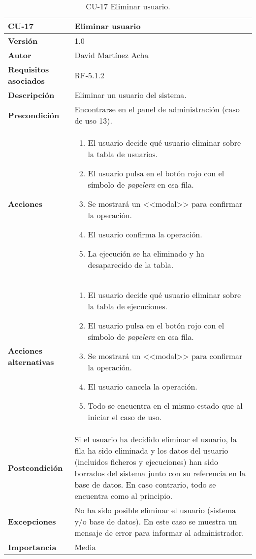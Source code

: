 \begin{table}[p]
	\centering
	\begin{tabularx}{\linewidth}{ p{} p{} }
		\toprule
		\textbf{CU-17}    & \textbf{Eliminar usuario}\\
		\toprule
		\textbf{Versión}              & 1.0    \\
		\textbf{Autor}                & David Martínez Acha \\
		\textbf{Requisitos asociados} & RF-5.1.2 \\
		\textbf{Descripción}          & Eliminar un usuario del sistema. \\
		\textbf{Precondición}         & Encontrarse en el panel de administración (caso de uso 13). \\
		\textbf{Acciones}             &
		\begin{enumerate}
			\def\labelenumi{\arabic{enumi}.}
			\tightlist
			\item El usuario decide qué usuario eliminar sobre la tabla de usuarios.
			\item El usuario pulsa en el botón rojo con el símbolo de \textit{papelera} en esa fila.
			\item Se mostrará un <<modal>> para confirmar la operación.
			\item El usuario confirma la operación.
			\item La ejecución se ha eliminado y ha desaparecido de la tabla.
		\end{enumerate}\\
		\textbf{Acciones alternativas}&
		\begin{enumerate}
			\def\labelenumi{\arabic{enumi}.}
			\tightlist
			\item El usuario decide qué usuario eliminar sobre la tabla de ejecuciones.
			\item El usuario pulsa en el botón rojo con el símbolo de \textit{papelera} en esa fila.
			\item Se mostrará un <<modal>> para confirmar la operación.
			\item El usuario cancela la operación.
			\item Todo se encuentra en el mismo estado que al iniciar el caso de uso.
		\end{enumerate}\\
		\textbf{Postcondición}        & Si el usuario ha decidido eliminar el usuario, la fila ha sido eliminada y los datos del usuario (incluidos ficheros y ejecuciones) han sido borrados del sistema junto con su referencia en la base de datos. 
		En caso contrario, todo se encuentra como al principio.\\
		\textbf{Excepciones}          & No ha sido posible eliminar el usuario (sistema y/o base de datos). En este caso se muestra un mensaje de error para informar al administrador. \\
		\textbf{Importancia}          & Media \\
		\bottomrule
	\end{tabularx}
	\caption{CU-17 Eliminar usuario.}
\end{table}

